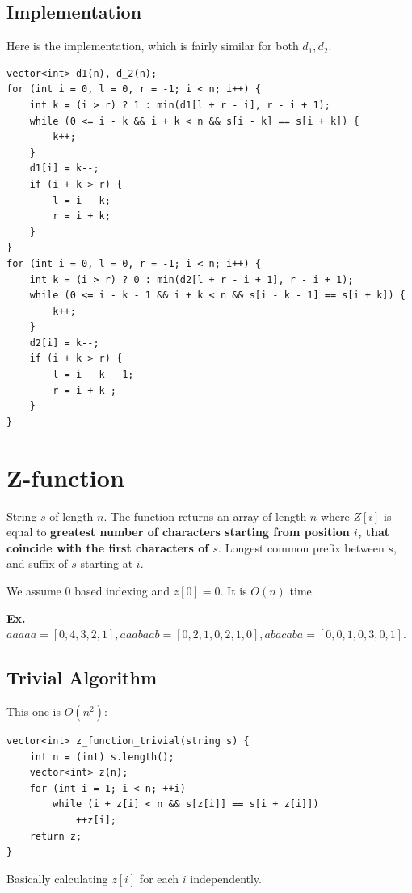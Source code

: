 \documentclass{IEEEtran}
\begin{document}
    \subsection{Implementation}
      Here is the implementation, which is fairly similar for both $d_1,d_2$.
      \begin{lstlisting}
vector<int> d1(n), d_2(n);
for (int i = 0, l = 0, r = -1; i < n; i++) {
    int k = (i > r) ? 1 : min(d1[l + r - i], r - i + 1);
    while (0 <= i - k && i + k < n && s[i - k] == s[i + k]) {
        k++;
    }
    d1[i] = k--;
    if (i + k > r) {
        l = i - k;
        r = i + k;
    }
}
for (int i = 0, l = 0, r = -1; i < n; i++) {
    int k = (i > r) ? 0 : min(d2[l + r - i + 1], r - i + 1);
    while (0 <= i - k - 1 && i + k < n && s[i - k - 1] == s[i + k]) {
        k++;
    }
    d2[i] = k--;
    if (i + k > r) {
        l = i - k - 1;
        r = i + k ;
    }
}
      \end{lstlisting}
  \section{Z-function}
    String $s$ of length $n$. The function returns an array of length $n$ where $Z[i]$ is equal to \textbf{greatest number of characters starting from position $i$, that coincide with the first characters of $s$}. Longest common prefix between $s$, and suffix of $s$ starting at $i$.\par 
    We assume 0 based indexing and $z[0]=0$. It is $O(n)$ time. \par 
    \textbf{Ex.} $aaaaa=[0,4,3,2,1], aaabaab=[0,2,1,0,2,1,0], abacaba=[0,0,1,0,3,0,1]$. \par 
    \subsection{Trivial Algorithm}
      This one is $O(n^2)$: 
      \begin{lstlisting}
vector<int> z_function_trivial(string s) {
    int n = (int) s.length();
    vector<int> z(n);
    for (int i = 1; i < n; ++i)
        while (i + z[i] < n && s[z[i]] == s[i + z[i]])
            ++z[i];
    return z;
}
      \end{lstlisting}
      Basically calculating $z[i]$ for each $i$ independently.
\end{document}
